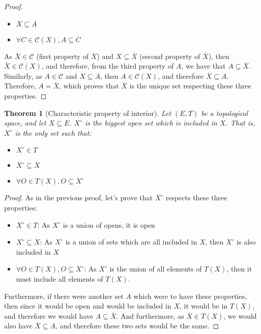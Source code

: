 \documentclass{article}
\newtheorem{theorem}{Theorem}[section]
\theoremstyle{definition}
\theoremstyle{remark}
\theoremstyle{example}
\theoremstyle{notation}
\newcommand{\inter}[1]{{{#1}^\circ}}
\newcommand{\closed}{\mathcal{C}}
\begin{document}
\begin{proof}
\begin{itemize}
				\item $X \subseteq A$
				\item $\forall C \in \closed(X), A \subseteq C$
		\end{itemize}
		As $\overline{X} \in \closed$ (first property of $\overline{X}$) and $X \subseteq \overline{X}$ (second property of $\overline{X}$), then $\overline{X} \in \closed(X)$, and therefore, from the third property of $A$, we have that $A \subseteq \overline{X}$. Similarly, as $A \in \closed$ and $X \subseteq A$, then $A \in \closed(X)$, and therefore $\overline{X} \subseteq A$. Therefore, $A = \overline{X}$, which proves that $\overline{X}$ is the unique set respecting these three properties.
\end{proof}

\begin{theorem}[Characteristic property of interior] \label{interior-charac}
		Let $(E, T)$ be a topological space, and let $X \subseteq E$. $\inter{X}$ is the biggest open set which is included in $X$. That is, $\inter{X}$ is the only set such that:
		\begin{itemize}
				\item $\inter{X} \in T$
				\item $\inter{X} \subseteq X$
				\item $\forall O \in T(X), O \subseteq \inter{X}$
		\end{itemize}
\end{theorem}

\begin{proof}
		As in the previous proof, let's prove that $\inter{X}$ respects these three properties:
		\begin{itemize}
				\item $\inter{X} \in T$: As $\inter{X}$ is a union of opens, it is open
				\item $\inter{X} \subseteq X$: As $\inter{X}$ is a union of sets which are all included in $X$, then $\inter{X}$ is also included in $X$
				\item $\forall O \in T(X), O \subseteq \inter{X}$: As $\inter{X}$ is the union of all elements of $T(X)$, then it must include all elements of $T(X)$.
		\end{itemize}
		Furthermore, if there were another set $A$ which were to have these properties, then since it would be open and would be included in $X$, it would be in $T(X)$, and therefore we would have $A \subseteq \overline{X}$. And furthermore, as $\overline{X} \in T(X)$, we would also have $\overline{X} \subseteq A$, and therefore these two sets would be the same.
\end{proof}
\end{document}
